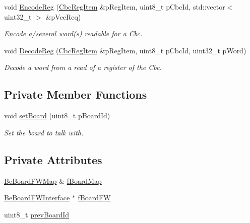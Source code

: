 \begin{DoxyCompactItemize}
void \hyperlink{class_ph2___hw_interface_1_1_cbc_interface_a673d4cba39ab42870573baf00800dd62}{Encode\-Reg} (\hyperlink{struct_ph2___hw_description_1_1_cbc_reg_item}{Cbc\-Reg\-Item} \&p\-Reg\-Item, uint8\-\_\-t p\-Cbc\-Id, std\-::vector$<$ uint32\-\_\-t $>$ \&p\-Vec\-Req)
\begin{DoxyCompactList}\small\item\em Encode a/several word(s) readable for a Cbc. \end{DoxyCompactList}\item 
void \hyperlink{class_ph2___hw_interface_1_1_cbc_interface_af9f86fa0a60d5f2be2de715f97fd169d}{Decode\-Reg} (\hyperlink{struct_ph2___hw_description_1_1_cbc_reg_item}{Cbc\-Reg\-Item} \&p\-Reg\-Item, uint8\-\_\-t p\-Cbc\-Id, uint32\-\_\-t p\-Word)
\begin{DoxyCompactList}\small\item\em Decode a word from a read of a register of the Cbc. \end{DoxyCompactList}\end{DoxyCompactItemize}
\subsection*{Private Member Functions}
\begin{DoxyCompactItemize}
\item 
void \hyperlink{class_ph2___hw_interface_1_1_cbc_interface_a39fac7185fffec4462d31d324ea9a54a}{set\-Board} (uint8\-\_\-t p\-Board\-Id)
\begin{DoxyCompactList}\small\item\em Set the board to talk with. \end{DoxyCompactList}\end{DoxyCompactItemize}
\subsection*{Private Attributes}
\begin{DoxyCompactItemize}
\item 
\hyperlink{namespace_ph2___hw_interface_ac35d341eb47fa7cbe4d28ccbc6ab4875}{Be\-Board\-F\-W\-Map} \& \hyperlink{class_ph2___hw_interface_1_1_cbc_interface_a0e34094468be36ee2c65e15f72178303}{f\-Board\-Map}
\item 
\hyperlink{class_ph2___hw_interface_1_1_be_board_f_w_interface}{Be\-Board\-F\-W\-Interface} $\ast$ \hyperlink{class_ph2___hw_interface_1_1_cbc_interface_a8c37c0f580a1918fc11a207aff085a72}{f\-Board\-F\-W}
\item 
uint8\-\_\-t \hyperlink{class_ph2___hw_interface_1_1_cbc_interface_ad4c28eff1e453e9954445f9fe02c16b6}{prev\-Board\-Id}
\end{DoxyCompactItemize}


